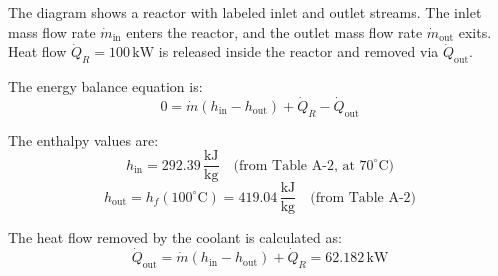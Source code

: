 The diagram shows a reactor with labeled inlet and outlet streams. The inlet mass flow rate \( \dot{m}_{\text{in}} \) enters the reactor, and the outlet mass flow rate \( \dot{m}_{\text{out}} \) exits. Heat flow \( \dot{Q}_R = 100 \, \text{kW} \) is released inside the reactor and removed via \( \dot{Q}_{\text{out}} \).  

The energy balance equation is:  
\[
0 = \dot{m} (h_{\text{in}} - h_{\text{out}}) + \dot{Q}_R - \dot{Q}_{\text{out}}
\]  

The enthalpy values are:  
\[
h_{\text{in}} = 292.39 \, \frac{\text{kJ}}{\text{kg}} \quad \text{(from Table A-2, at } 70^\circ\text{C}\text{)}
\]  
\[
h_{\text{out}} = h_f(100^\circ\text{C}) = 419.04 \, \frac{\text{kJ}}{\text{kg}} \quad \text{(from Table A-2)}
\]  

The heat flow removed by the coolant is calculated as:  
\[
\dot{Q}_{\text{out}} = \dot{m} (h_{\text{in}} - h_{\text{out}}) + \dot{Q}_R = 62.182 \, \text{kW}
\]